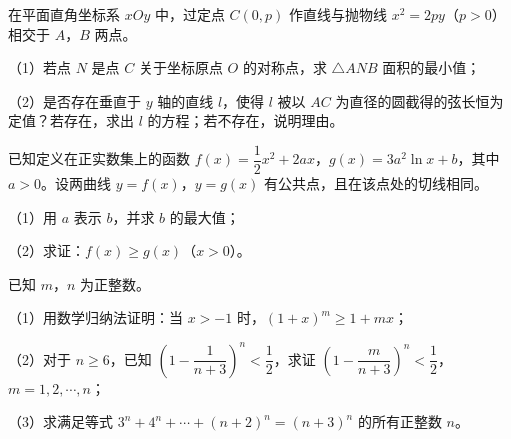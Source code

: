\endgroup
\begin{question}
在平面直角坐标系 $xOy$ 中，过定点 $C(0,p)$ 作直线与抛物线 $x^2=2py$（$p>0$）相交于 $A$，$B$ 两点。

（1）若点 $N$ 是点 $C$ 关于坐标原点 $O$ 的对称点，求 $\triangle ANB$ 面积的最小值；

（2）是否存在垂直于 $y$ 轴的直线 $l$，使得 $l$ 被以 $AC$ 为直径的圆截得的弦长恒为定值？若存在，求出 $l$ 的方程；若不存在，说明理由。
\nopagebreak[4]
\begin{center}\end{center}
\nopagebreak[4]
\end{question}
\begin{question}
已知定义在正实数集上的函数 $f(x)=\dfrac12x^2+2ax$，$g(x)=3a^2\ln x+b$，其中 $a>0$。设两曲线 $y=f(x)$，$y=g(x)$ 有公共点，且在该点处的切线相同。

（1）用 $a$ 表示 $b$，并求 $b$ 的最大值；

（2）求证：$f(x)\geqslant g(x)$（$x>0$）。

\end{question}
\begin{question}
已知 $m$，$n$ 为正整数。

（1）用数学归纳法证明：当 $x>-1$ 时，$(1+x)^m\geqslant1+mx$；

（2）对于 $n\geqslant6$，已知 $\left(1-\dfrac1{n+3}\right)^n<\dfrac12$，求证 $\left(1-\dfrac m{n+3}\right)^n<\dfrac12$，$m=1,2,\cdots,n$；

（3）求满足等式 $3^n+4^n+\cdots+(n+2)^n=(n+3)^n$ 的所有正整数 $n$。

\end{question}